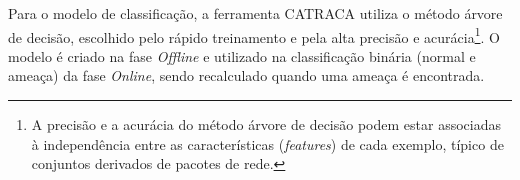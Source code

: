 % 


Para o modelo de classificação, a ferramenta CATRACA utiliza o método árvore de
decisão, escolhido pelo rápido treinamento e pela alta precisão e acurácia\footnote{
    A precisão e a acurácia do método árvore de decisão podem estar associadas
    à independência entre as características (\emph{features}) de cada exemplo,
    típico de conjuntos derivados de pacotes de rede.
}.
O modelo é criado na fase \emph{Offline} e utilizado na classificação binária
(normal e ameaça) da fase \emph{Online}, sendo recalculado quando uma ameaça
é encontrada.


